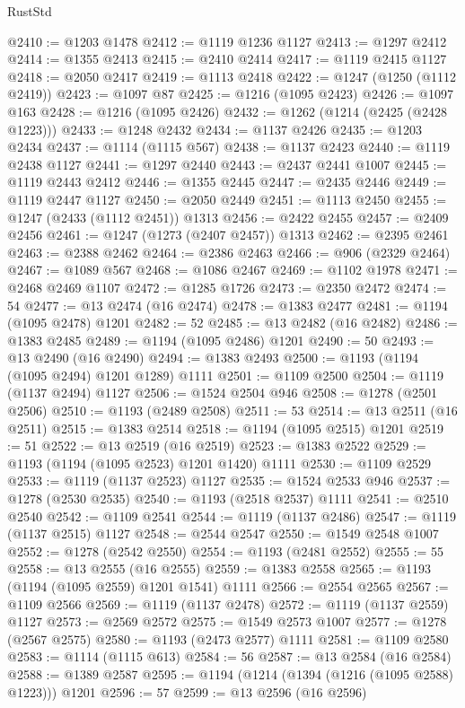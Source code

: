 \begin{lexlean}{RustStd}
\begin{coremodule}
@2410 := @1203 @1478
@2412 := @1119 @1236 @1127
@2413 := @1297 @2412
@2414 := @1355 @2413
@2415 := @2410 @2414
@2417 := @1119 @2415 @1127
@2418 := @2050 @2417
@2419 := @1113 @2418
@2422 := @1247 (@1250 (@1112 @2419))
@2423 := @1097 @87
@2425 := @1216 (@1095 @2423)
@2426 := @1097 @163
@2428 := @1216 (@1095 @2426)
@2432 := @1262 (@1214 (@2425 (@2428 @1223)))
@2433 := @1248 @2432
@2434 := @1137 @2426
@2435 := @1203 @2434
@2437 := @1114 (@1115 @567)
@2438 := @1137 @2423
@2440 := @1119 @2438 @1127
@2441 := @1297 @2440
@2443 := @2437 @2441 @1007
@2445 := @1119 @2443 @2412
@2446 := @1355 @2445
@2447 := @2435 @2446
@2449 := @1119 @2447 @1127
@2450 := @2050 @2449
@2451 := @1113 @2450
@2455 := @1247 (@2433 (@1112 @2451)) @1313
@2456 := @2422 @2455
@2457 := @2409 @2456
@2461 := @1247 (@1273 (@2407 @2457)) @1313
@2462 := @2395 @2461
@2463 := @2388 @2462
@2464 := @2386 @2463
@2466 := @906 (@2329 @2464)
@2467 := @1089 @567
@2468 := @1086 @2467
@2469 := @1102 @1978
@2471 := @2468 @2469 @1107
@2472 := @1285 @1726
@2473 := @2350 @2472
@2474 := 54
@2477 := @13 @2474 (@16 @2474)
@2478 := @1383 @2477
@2481 := @1194 (@1095 @2478) @1201
@2482 := 52
@2485 := @13 @2482 (@16 @2482)
@2486 := @1383 @2485
@2489 := @1194 (@1095 @2486) @1201
@2490 := 50
@2493 := @13 @2490 (@16 @2490)
@2494 := @1383 @2493
@2500 := @1193 (@1194 (@1095 @2494) @1201 @1289) @1111
@2501 := @1109 @2500
@2504 := @1119 (@1137 @2494) @1127
@2506 := @1524 @2504 @946
@2508 := @1278 (@2501 @2506)
@2510 := @1193 (@2489 @2508)
@2511 := 53
@2514 := @13 @2511 (@16 @2511)
@2515 := @1383 @2514
@2518 := @1194 (@1095 @2515) @1201
@2519 := 51
@2522 := @13 @2519 (@16 @2519)
@2523 := @1383 @2522
@2529 := @1193 (@1194 (@1095 @2523) @1201 @1420) @1111
@2530 := @1109 @2529
@2533 := @1119 (@1137 @2523) @1127
@2535 := @1524 @2533 @946
@2537 := @1278 (@2530 @2535)
@2540 := @1193 (@2518 @2537) @1111
@2541 := @2510 @2540
@2542 := @1109 @2541
@2544 := @1119 (@1137 @2486)
@2547 := @1119 (@1137 @2515) @1127
@2548 := @2544 @2547
@2550 := @1549 @2548 @1007
@2552 := @1278 (@2542 @2550)
@2554 := @1193 (@2481 @2552)
@2555 := 55
@2558 := @13 @2555 (@16 @2555)
@2559 := @1383 @2558
@2565 := @1193 (@1194 (@1095 @2559) @1201 @1541) @1111
@2566 := @2554 @2565
@2567 := @1109 @2566
@2569 := @1119 (@1137 @2478)
@2572 := @1119 (@1137 @2559) @1127
@2573 := @2569 @2572
@2575 := @1549 @2573 @1007
@2577 := @1278 (@2567 @2575)
@2580 := @1193 (@2473 @2577) @1111
@2581 := @1109 @2580
@2583 := @1114 (@1115 @613)
@2584 := 56
@2587 := @13 @2584 (@16 @2584)
@2588 := @1389 @2587
@2595 := @1194 (@1214 (@1394 (@1216 (@1095 @2588) @1223))) @1201
@2596 := 57
@2599 := @13 @2596 (@16 @2596)

\end{coremodule}
\end{lexlean}
